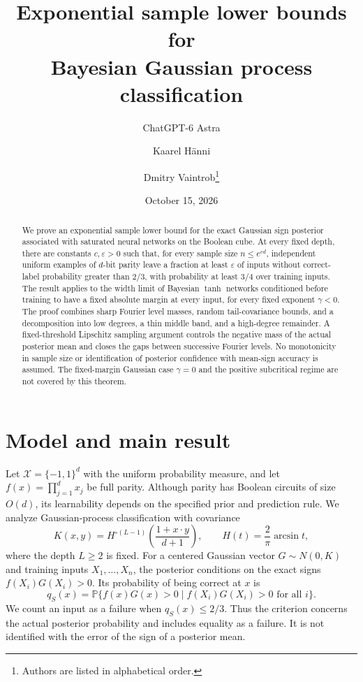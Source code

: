 \documentclass[11pt]{article}
\title{Exponential sample lower bounds for\\Bayesian Gaussian process classification}
\author{ChatGPT-6 Astra \and Kaarel H\"anni \and Dmitry Vaintrob\thanks{Authors are listed in alphabetical order.}}
\date{October 15, 2026}
\theoremstyle{remark}\newtheorem{remark}[theorem]{Remark}
\begin{document}
\maketitle
\begin{abstract}
We prove an exponential sample lower bound for the exact Gaussian sign
posterior associated with saturated neural networks on the Boolean cube.
At every fixed depth, there are constants $c,\varepsilon>0$ such that,
for every sample size $n\le e^{cd}$, independent uniform examples of
$d$-bit parity leave a fraction at least $\varepsilon$ of inputs without
correct-label probability greater than $2/3$, with probability at least
$3/4$ over training inputs. The result applies to the width limit of
Bayesian $\tanh$ networks conditioned before training to have a fixed
absolute margin at every input, for every fixed exponent $\gamma<0$.
The proof combines sharp Fourier level masses, random tail-covariance
bounds, and a decomposition into low degrees, a thin middle band, and
a high-degree remainder. A fixed-threshold Lipschitz sampling argument
controls the negative mass of the actual posterior mean and closes the
gaps between successive Fourier levels. No monotonicity in sample size
or identification of posterior confidence with mean-sign accuracy is
assumed. The fixed-margin Gaussian case $\gamma=0$ and the positive
subcritical regime are not covered by this theorem.
\end{abstract}

\section{Model and main result}
Let $\mathcal X=\{-1,1\}^d$ with the uniform probability measure, and
let $f(x)=\prod_{j=1}^d x_j$ be full parity. Although parity has Boolean
circuits of size $O(d)$, its learnability depends on the specified prior
and prediction rule. We analyze Gaussian-process classification with
covariance
\begin{equation}\label{eq:paper-kernel}
 K(x,y)=H^{\circ(L-1)}\!\left(\frac{1+x\cdot y}{d+1}\right),
 \qquad H(t)=\frac2\pi\arcsin t,
\end{equation}
where the depth $L\ge2$ is fixed. For a centered Gaussian vector
$G\sim N(0,K)$ and training inputs $X_1,\ldots,X_n$, the posterior
conditions on the exact signs $f(X_i)G(X_i)>0$. Its probability of
being correct at $x$ is
\[
 q_S(x)=\mathbb P\{f(x)G(x)>0\mid f(X_i)G(X_i)>0\text{ for all }i\}.
\]
We count an input as a failure when $q_S(x)\le2/3$. Thus the criterion
concerns the actual posterior probability and includes equality as a
failure. It is not identified with the error of the sign of a posterior
mean.
\end{document}
